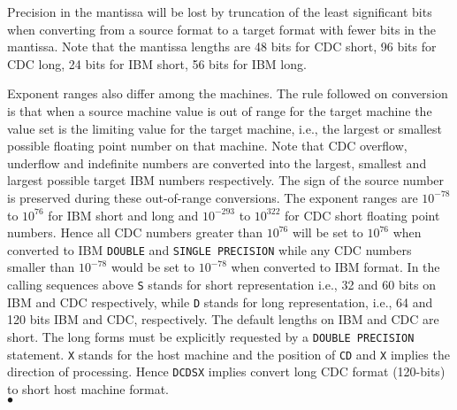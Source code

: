 \newpage
\Accuracy
Precision in the mantissa will be lost by truncation
of the least significant bits when converting from a source format to a
target format with fewer bits in the mantissa. Note that the mantissa
lengths are 48 bits for CDC short, 96 bits for CDC long, 24 bits for
IBM short, 56 bits for IBM long.
\par
Exponent ranges also differ among the machines. The rule
followed on conversion is that when a source machine value is out of
range for the target machine the value set is the limiting value for
the target machine, i.e., the largest or smallest possible floating
point number on that machine. Note that CDC overflow, underflow and
indefinite numbers are converted into the largest, smallest and largest
possible target IBM numbers respectively. The sign of the source
number is preserved during these out-of-range conversions. The
exponent ranges are $10^{-78}$ to $10^{76}$ for IBM short and long and
$10^{-293}$ to $10^{322}$ for CDC short floating point numbers. Hence all
CDC numbers greater than $10^{76}$ will be set to $10^{76}$ when
converted to IBM {\tt DOUBLE} and {\tt SINGLE PRECISION} while any CDC
numbers smaller than $10^{-78}$ would be set to $10^{-78}$ when converted
to IBM format.
\Notes
In the calling sequences above {\tt S} stands for short
representation i.e., 32 and 60 bits on IBM and CDC
respectively, while {\tt D} stands for long representation, i.e., 64
and 120 bits IBM and CDC, respectively. The default lengths
on IBM and CDC are short. The long forms must be explicitly
requested by a {\tt DOUBLE PRECISION} statement. {\tt X} stands for
the host machine and the position of {\tt CD} and {\tt X} implies the
direction of processing. Hence {\tt DCDSX} implies convert long CDC
format (120-bits) to short host machine format.
\\ $\bullet$
